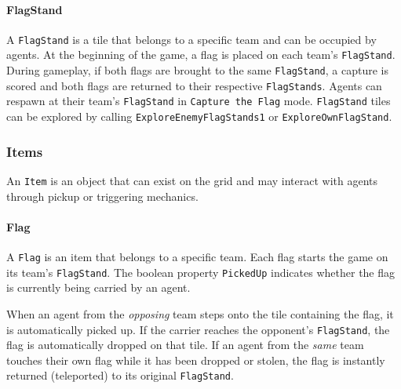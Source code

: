 \documentclass[a4paper,english,DIV=16,11pt,parskip=half,dvipsnames,listof=totoc,index=totoc,bibliography=totoc]{scrartcl}
\begin{document}
\paragraph{FlagStand} \label{par:flagstandDesc}
A \texttt{FlagStand} is a tile that belongs to a specific team and can be occupied by agents. At the beginning of the game, a flag is placed on each team’s \texttt{FlagStand}. During gameplay, if both flags are brought to the same \texttt{FlagStand}, a capture is scored and both flags are returned to their respective \texttt{FlagStands}. Agents can respawn at their team's \texttt{FlagStand} in \texttt{Capture the Flag} mode. \texttt{FlagStand} tiles can be explored by calling \texttt{ExploreEnemyFlagStands1} or \texttt{ExploreOwnFlagStand}.

\subsubsection{Items} \label{sssec:items}
An \texttt{Item} is an object that can exist on the grid and may interact with agents through pickup or triggering mechanics.

\paragraph{Flag} \label{par:flagItemDesc}
A \texttt{Flag} is an item that belongs to a specific team. Each flag starts the game on its team's \texttt{FlagStand}. The boolean property \texttt{PickedUp} indicates whether the flag is currently being carried by an agent.

When an agent from the \emph{opposing} team steps onto the tile containing the flag, it is automatically picked up. If the carrier reaches the opponent's \texttt{FlagStand}, the flag is automatically dropped on that tile. If an agent from the \emph{same} team touches their own flag while it has been dropped or stolen, the flag is instantly returned (teleported) to its original \texttt{FlagStand}.
\end{document}
